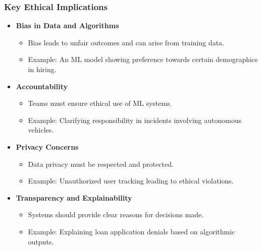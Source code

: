 \documentclass{beamer}
\begin{document}
\begin{frame}[fragile]
    \frametitle{Key Ethical Implications}
    \begin{itemize}
        \item \textbf{Bias in Data and Algorithms}
            \begin{itemize}
                \item Bias leads to unfair outcomes and can arise from training data.
                \item Example: An ML model showing preference towards certain demographics in hiring.
            \end{itemize}
        
        \item \textbf{Accountability}
            \begin{itemize}
                \item Teams must ensure ethical use of ML systems.
                \item Example: Clarifying responsibility in incidents involving autonomous vehicles.
            \end{itemize}
        
        \item \textbf{Privacy Concerns}
            \begin{itemize}
                \item Data privacy must be respected and protected.
                \item Example: Unauthorized user tracking leading to ethical violations.
            \end{itemize}
        
        \item \textbf{Transparency and Explainability}
            \begin{itemize}
                \item Systems should provide clear reasons for decisions made.
                \item Example: Explaining loan application denials based on algorithmic outputs.
            \end{itemize}
    \end{itemize}
\end{frame}
\end{document}
